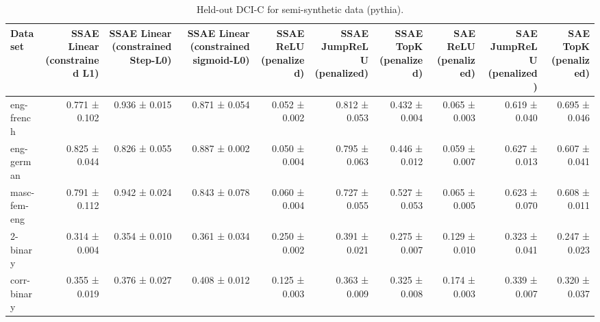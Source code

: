 \begin{table}[t]
\centering
\caption{Held-out DCI-C for semi-synthetic data (pythia).}
\label{tab:semisynthetic-pythia-dci-c}
\begin{tabular}{lrrrrrrrrr}
\toprule
Dataset & SSAE Linear (constrained L1) & SSAE Linear (constrained Step-L0) & SSAE Linear (constrained sigmoid-L0) & SSAE ReLU (penalized) & SSAE JumpReLU (penalized) & SSAE TopK (penalized) & SAE ReLU (penalized) & SAE JumpReLU (penalized) & SAE TopK (penalized) \\
\midrule
eng-french & 0.771 ± 0.102 & 0.936 ± 0.015 & 0.871 ± 0.054 & 0.052 ± 0.002 & 0.812 ± 0.053 & 0.432 ± 0.004 & 0.065 ± 0.003 & 0.619 ± 0.040 & 0.695 ± 0.046 \\
eng-german & 0.825 ± 0.044 & 0.826 ± 0.055 & 0.887 ± 0.002 & 0.050 ± 0.004 & 0.795 ± 0.063 & 0.446 ± 0.012 & 0.059 ± 0.007 & 0.627 ± 0.013 & 0.607 ± 0.041 \\
masc-fem-eng & 0.791 ± 0.112 & 0.942 ± 0.024 & 0.843 ± 0.078 & 0.060 ± 0.004 & 0.727 ± 0.055 & 0.527 ± 0.053 & 0.065 ± 0.005 & 0.623 ± 0.070 & 0.608 ± 0.011 \\
2-binary & 0.314 ± 0.004 & 0.354 ± 0.010 & 0.361 ± 0.034 & 0.250 ± 0.002 & 0.391 ± 0.021 & 0.275 ± 0.007 & 0.129 ± 0.010 & 0.323 ± 0.041 & 0.247 ± 0.023 \\
corr-binary & 0.355 ± 0.019 & 0.376 ± 0.027 & 0.408 ± 0.012 & 0.125 ± 0.003 & 0.363 ± 0.009 & 0.325 ± 0.008 & 0.174 ± 0.003 & 0.339 ± 0.007 & 0.320 ± 0.037 \\
\bottomrule
\end{tabular}
\end{table}

